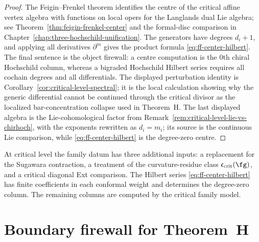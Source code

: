 \begin{proof}
The Feigin--Frenkel theorem identifies the centre of the critical
affine vertex algebra with functions on local opers for the Langlands
dual Lie algebra; see Theorem~\ref{thm:feigin-frenkel-center} and the
formal-disc comparison in Chapter~\ref{chap:three-hochschild-unification}.
The generators have degrees $d_i+1$, and applying all derivatives
$\partial^m$ gives the product formula
\eqref{eq:ff-center-hilbert}. The final sentence is the object
firewall: a centre computation is the $0$th chiral Hochschild column,
whereas a bigraded Hochschild Hilbert series requires all cochain
degrees and all differentials. The displayed perturbation identity is
Corollary~\ref{cor:critical-level-spectral}; it is the local
calculation showing why the generic differential cannot be continued
through the critical divisor as the localized bar-concentration
collapse used in
Theorem~H. The last displayed algebra is the Lie-cohomological factor
from Remark~\ref{rem:critical-level-lie-vs-chirhoch}, with the
exponents rewritten as $d_i=m_i$; its source is the continuous Lie
comparison, while \eqref{eq:ff-center-hilbert} is the degree-zero
centre.
\end{proof}

\begin{remark}
\label{rem:critical-level-separately-parametrised}
At critical level the family datum has three additional inputs: a
replacement for the Sugawara contraction, a treatment of the
curvature-residue class $\mathfrak c_{\mathrm{crit}}(\fg)$, and a
critical diagonal Ext comparison. The Hilbert series
\eqref{eq:ff-center-hilbert} has finite coefficients in each
conformal weight and determines the degree-zero column.  The remaining
columns are computed by the critical family model.
\end{remark}

\section{Boundary firewall for Theorem~H}
\label{sec:theorem-h-unified}

